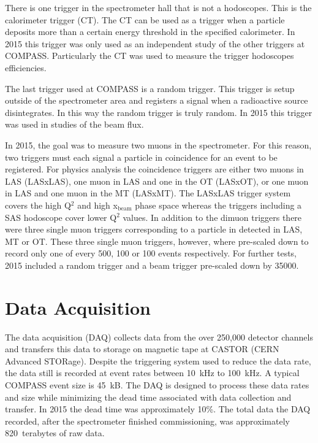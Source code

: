There is one trigger in the spectrometer hall that is not a hodoscopes.  This is
the calorimeter trigger (CT).  The CT can be used as a trigger when a particle
deposits more than a certain energy threshold in the specified calorimeter.  In
2015 this trigger was only used as an independent study of the other triggers at
COMPASS. Particularly the CT was used to measure the trigger hodoscopes
efficiencies. \par

The last trigger used at COMPASS is a random trigger.  This trigger is setup
outside of the spectrometer area and registers a signal when a radioactive
source disintegrates.  In this way the random trigger is truly random.  In 2015
this trigger was used in studies of the beam flux.

In 2015, the goal was to measure two muons in the spectrometer.  For this
reason, two triggers must each signal a particle in coincidence for an event to
be registered.  For physics analysis the coincidence triggers are either two
muons in LAS (LASxLAS), one muon in LAS and one in the OT (LASxOT), or one muon
in LAS and one muon in the MT (LASxMT).  The LASxLAS trigger system covers the
high Q$^2$ and high x$_{\mathrm{beam}}$ phase space whereas the triggers
including a SAS hodoscope cover lower Q$^2$ values.  In addition to the dimuon
triggers there were three single muon triggers corresponding to a particle in
detected in LAS, MT or OT.  These three single muon triggers, however, where
pre-scaled down to record only one of every 500, 100 or 100 events respectively.
For further tests, 2015 included a random trigger and a beam trigger pre-scaled
down by 35000.


\section{Data Acquisition}
The data acquisition (DAQ) collects data from the over 250,000 detector channels
and transfers this data to storage on magnetic tape at CASTOR (CERN Advanced
STORage).  Despite the triggering system used to reduce the data rate, the data
still is recorded at event rates between 10~kHz to 100~kHz.  A typical COMPASS
event size is 45~kB.  The DAQ is designed to process these data rates and size
while minimizing the dead time associated with data collection and transfer. In
2015 the dead time was approximately 10\%.  The total data the DAQ recorded,
after the spectrometer finished commissioning, was approximately 820~terabytes
of raw data. \par

